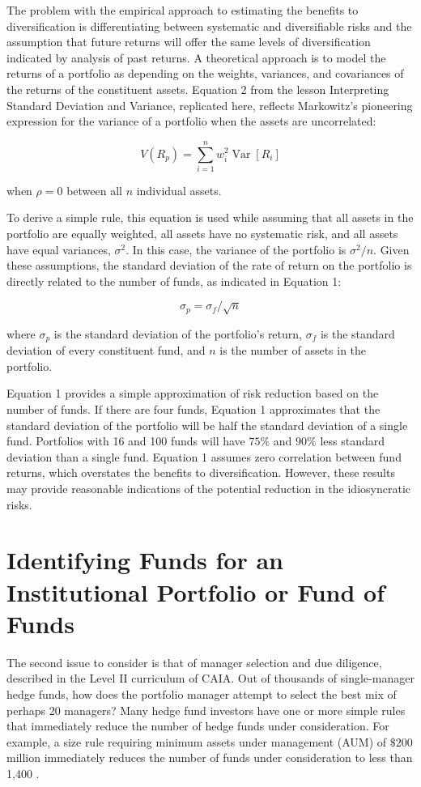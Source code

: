 \documentclass[11pt]{article}
\begin{document}
The problem with the empirical approach to estimating the benefits to diversification is differentiating between systematic and diversifiable risks and the assumption that future returns will offer the same levels of diversification indicated by analysis of past returns. A theoretical approach is to model the returns of a portfolio as depending on the weights, variances, and covariances of the returns of the constituent assets. Equation 2 from the lesson Interpreting Standard Deviation and Variance, replicated here, reflects Markowitz's pioneering expression for the variance of a portfolio when the assets are uncorrelated:

$$
V\left(R_{p}\right)=\sum_{i=1}^{n} w_{i}^{2} \operatorname{Var}\left[R_{i}\right]
$$

when $\rho=0$ between all $n$ individual assets.

To derive a simple rule, this equation is used while assuming that all assets in the portfolio are equally weighted, all assets have no systematic risk, and all assets have equal variances, $\sigma^{2}$. In this case, the variance of the portfolio is $\sigma^{2} / n$. Given these assumptions, the standard deviation of the rate of return on the portfolio is directly related to the number of funds, as indicated in Equation 1:


\begin{equation*}
\sigma_{p}=\sigma_{f} / \sqrt{n} \tag{1}
\end{equation*}


where $\sigma_{p}$ is the standard deviation of the portfolio's return, $\sigma_{f}$ is the standard deviation of every constituent fund, and $n$ is the number of assets in the portfolio.

Equation 1 provides a simple approximation of risk reduction based on the number of funds. If there are four funds, Equation 1 approximates that the standard deviation of the portfolio will be half the standard deviation of a single fund. Portfolios with 16 and 100 funds will have $75 \%$ and $90 \%$ less standard deviation than a single fund. Equation 1 assumes zero correlation between fund returns, which overstates the benefits to diversification. However, these results may provide reasonable indications of the potential reduction in the idiosyncratic risks.

\section*{Identifying Funds for an Institutional Portfolio or Fund of Funds}
The second issue to consider is that of manager selection and due diligence, described in the Level II curriculum of CAIA. Out of thousands of single-manager hedge funds, how does the portfolio manager attempt to select the best mix of perhaps 20 managers? Many hedge fund investors have one or more simple rules that immediately reduce the number of hedge funds under consideration. For example, a size rule requiring minimum assets under management (AUM) of $\$ 200$ million immediately reduces the number of funds under consideration to less than 1,400 .
\end{document}
